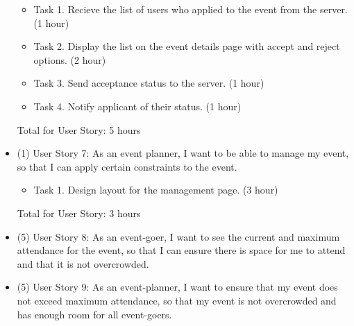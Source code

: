 \documentclass[10pt]{article}
\newcommand{\fancysubX}[2] {{\color{primary}\subsection*{#1} \label{sec:#2}}}
\begin{document}
\begin{itemize}
		\begin{itemize}
		    \item Task 1. Recieve the list of users who applied to the event from the server. (1 hour)
		    \item Task 2. Display the list on the event details page with accept and reject options. (2 hour)
		    \item Task 3. Send acceptance status to the server. (1 hour)
		    \item Task 4. Notify applicant of their status. (1 hour)
		\end{itemize}
		Total for User Story: 5 hours
		
	    \item (1) User Story 7: As an event planner, I want to be able to manage my event, so that I can apply certain constraints to the event.

		\begin{itemize}
		    \item Task 1. Design layout for the management page. (3 hour)
		\end{itemize}
		Total for User Story: 3 hours
		
		\item (5) User Story 8: As an event-goer, I want to see the current and maximum attendance for the event, so that I can ensure there is space for me to attend and that it is not overcrowded.
        
        \item (5) User Story 9: As an event-planner, I want to ensure that my event does not exceed maximum attendance, so that my event is not overcrowded and has enough room for all event-goers.
		
        \end{itemize}
        

     
        
         
\end{document}
